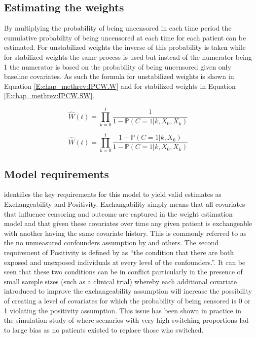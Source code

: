 \subsection{Estimating the weights}

By multiplying the probability of being uncensored in each time period the cumulative probability of being uncensored at each time for each patient can be estimated. For unstabilized weights the inverse of this probability is taken while for stabilized weights the same process is used but instead of the numerator being 1 the numerator is based on the probability of being uncensored given only baseline covariates. As such the formula for unstabilized weights is shown in Equation \ref{E:chap_methrev:IPCW.W} and for stabilized weights in Equation \ref{E:chap_methrev:IPCW.SW}. 

\begin{equation}
\label{E:chap_methrev:IPCW.W}
\hat{W}(t) = \prod^t_{k=0} \frac{1}{1-\mathbb{P}(C=1|k, X_0, X_k)}
\end{equation}

\begin{equation}
\label{E:chap_methrev:IPCW.SW}
\hat{W}(t) = \prod^t_{k=0} \frac{1-\mathbb{P}(C=1|k, X_0)}{1-\mathbb{P}(C=1|k, X_0, X_k)}
\end{equation}

\subsection{Model requirements}

\cite{Cole2008} identifies the key requirements for this model to yield valid estimates as Exchangeability and Positivity. Exchangability simply means that all covariates that influence censoring and outcome are captured in the weight estimation model and that given these covariates over time any given patient is exchangeable with another having the same covariate history. This is commonly referred to as the no unmeasured confounders assumption by \cite{TSD16} and others. The second requirement of Positivity is defined by \cite{Cole2008} as ``the condition that there are both exposed and unexposed individuals at every level of the confounders.''. It can be seen that these two conditions can be in conflict particularly in the presence of small sample sizes (such as a clinical trial) whereby each additional covariate introduced to improve the exchangeability assumption will increase the possibility of creating a level of covariates for which the probability of being censored is 0 or 1 violating the positivity assumption. This issue has been shown in practice in the simulation study of \cite{Latimer2013} where scenarios with very high switching proportions lad to large bias as no patients existed to replace those who switched.

